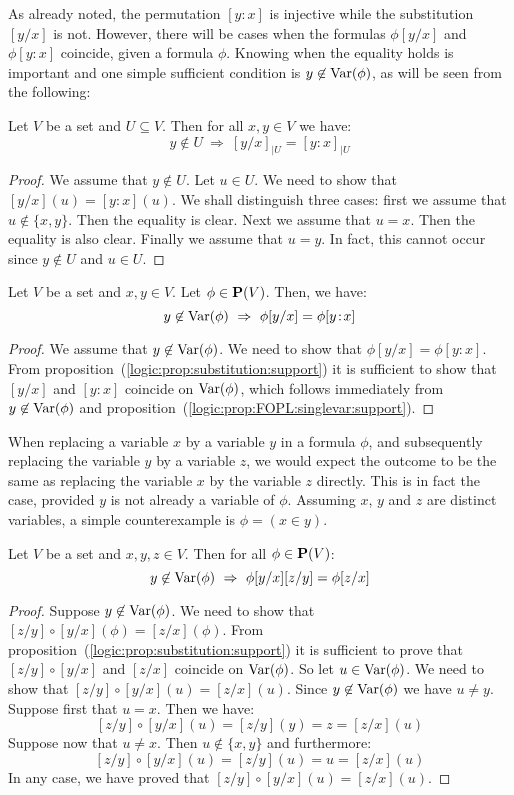 As already noted, the permutation $[y\!:\!x]$ is injective while the
substitution $[y/x]$ is not. However, there will be cases when the
formulas $\phi[y/x]$ and $\phi[y\!:\!x]$ coincide, given a formula
$\phi$. Knowing when the equality holds is important and one simple
sufficient condition is $y\not\in\mbox{\rm Var}(\phi)$, as will be seen from
the following:
\begin{prop}\label{logic:prop:FOPL:singlevar:support}
Let $V$ be a set and $U\subseteq V$. Then for all $x,y\in V$ we
have:
    \[
    y\not\in U\ \Rightarrow\ [y/x]_{|U}=[y\!:\!x]_{|U}
    \]
\end{prop}
\begin{proof}
We assume that $y\not\in U$. Let $u\in U$. We need to show that
$[y/x](u)=[y\!:\!x](u)$. We shall distinguish three cases: first we
assume that $u\not\in\{x,y\}$. Then the equality is clear. Next we
assume that $u=x$. Then the equality is also clear. Finally we
assume that $u=y$. In fact, this cannot occur since $y\not\in U$ and
$u\in U$.
\end{proof}
\begin{prop}\label{logic:prop:permutation:is:substitution}
Let $V$ be a set and $x,y\in V$. Let $\phi\in\mbox{${\bf P}(V)$}$. Then, we have:
    \[
    y\not\in\var(\phi)\ \Rightarrow\ \phi[y/x]=\phi[y\!:\!x]
    \]
\end{prop}
\begin{proof}
We assume that $y\not\in\mbox{\rm Var}(\phi)$. We need to show that
$\phi[y/x]=\phi[y\!:\!x]$. From
proposition~(\ref{logic:prop:substitution:support}) it is sufficient
to show that $[y/x]$ and $[y\!:\!x]$ coincide on $\mbox{\rm Var}(\phi)$, which
follows immediately from $y\not\in\mbox{\rm Var}(\phi)$ and
proposition~(\ref{logic:prop:FOPL:singlevar:support}).
\end{proof}

When replacing a variable $x$ by a variable $y$ in a formula $\phi$,
and subsequently replacing the variable $y$ by a variable $z$, we
would expect the outcome to be the same as replacing the variable
$x$ by the variable $z$ directly. This is in fact the case, provided
$y$ is not already a variable of $\phi$. Assuming $x$, $y$ and $z$
are distinct variables, a simple counterexample is $\phi=(x\in y)$.
\begin{prop}\label{logic:prop:single:composition}
Let $V$ be a set and $x,y,z\in V$. Then for all $\phi\in\mbox{${\bf P}(V)$}$:
    \[
    y\not\in\var(\phi)\ \Rightarrow\ \phi[y/x][z/y]=\phi[z/x]
    \]
\end{prop}
\begin{proof}
Suppose $y\not\in\mbox{\rm Var}(\phi)$. We need to show that
$[z/y]\circ[y/x](\phi)=[z/x](\phi)$. From
proposition~(\ref{logic:prop:substitution:support}) it is sufficient
to prove that $[z/y]\circ[y/x]$ and $[z/x]$ coincide on
$\mbox{\rm Var}(\phi)$. So let $u\in\mbox{\rm Var}(\phi)$. We need to show that
$[z/y]\circ[y/x](u)=[z/x](u)$. Since $y\not\in\mbox{\rm Var}(\phi)$ we have
$u\neq y$. Suppose first that $u=x$. Then we have:
    \[
    [z/y]\circ[y/x](u)=[z/y](y)=z=[z/x](u)
    \]
Suppose now that $u\neq x$. Then $u\not\in\{x,y\}$ and furthermore:
    \[
    [z/y]\circ[y/x](u)=[z/y](u)=u=[z/x](u)
    \]
In any case, we have proved that $[z/y]\circ[y/x](u)=[z/x](u)$.
\end{proof}

